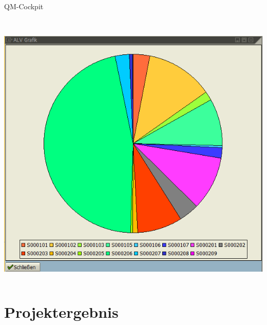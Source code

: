 \begin{frame}{QM-Cockpit}
\begin{columns}
\begin{column}{.5\textwidth}
			\\
 			\includegraphics[width=\textwidth]{QMCockpit4.png}
		\end{column}
	\end{columns}
\end{frame}

\section{Projektergebnis}
